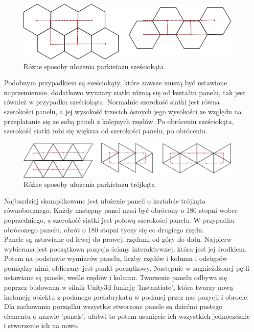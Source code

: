 \documentclass{article} %
\begin{document}
            \begin{figure}[!h]
            \centering
            \includegraphics[scale=0.3]{images/diagrams/panel_tiling_hexagon.png}
            \caption{Różne sposoby ułożenia parkietażu sześciokąta}
            \end{figure}
            
            Podobnym przypadkiem są sześciokąty, które zawsze muszą być ustawione naprzemiennie, dodatkowo wymiary siatki różnią się od kształtu panelu, tak jest również w przypadku sześciokąta. Normalnie szerokość siatki jest równa szerokości panelu, a jej wysokość trzecich ósmych jego wysokości ze względu na przeplatanie się ze sobą paneli z kolejnych rzędów. Po obróceniu sześciokąta, szerokość siatki robi się większa od szerokości panelu, po obróceniu.
            \\
            
            
            \begin{figure}[!h]
            \centering
            \includegraphics[scale=0.25]{images/diagrams/panel_tiling_triangles.png}
            \caption{Różne sposoby ułożenia parkietażu trójkąta}
            \end{figure}

            Najbardziej skomplikowane jest ułożenie paneli o kształcie trójkąta równobocznego. Każdy następny panel musi być obrócony o 180 stopni wobec poprzedniego, a szerokość siatki jest połową szerokości panelu. W przypadku obróconego panelu, obrót o 180 stopni tyczy się co drugiego rzędu.  
            \\
            
            Panele są ustawiane od lewej do prawej, rzędami od góry do dołu. Najpierw wybierana jest początkowa pozycja ściany interaktywnej, która jest jej środkiem. Potem na podstawie wymiarów panelu, liczby rzędów i kolumn i odstępów pomiędzy nimi, obliczany jest punkt początkowy. Następnie w zagnieżdżonej pętli ustawiane są panele, wedle rzędów i kolumn. Tworzenie panelu odbywa się poprzez budowaną w silnik Unity3d funkcję 'Instantiate', która tworzy nową instancję obiektu z podanego prefabrykatu w podanej przez nas pozycji i obrocie. Dla zachowania porządku wszystkie stworzone panele są dziećmi pustego elementu o nazwie 'panels', ułatwi to potem usunięcie ich wszystkich jednocześnie i stworzenie ich na nowo.
            \\
            
\end{document}
